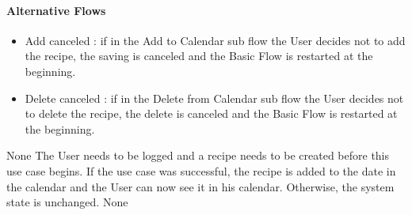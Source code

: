 {  \paragraph{Alternative Flows}
  \begin{itemize}
    \item Add canceled : if in the Add to Calendar sub flow the User decides not to add the recipe, the saving is canceled and the Basic Flow is restarted at the beginning.
    \item Delete canceled : if in the Delete from Calendar sub flow the User decides not to delete the recipe, the delete is canceled and the Basic Flow is restarted at the beginning.
  \end{itemize}
}
{None}
{The User needs to be logged and a recipe needs to be created before this use case begins.}
{If the use case was successful, the recipe is added to the date in the calendar and the User can now see it in his calendar. Otherwise, the system state is unchanged.}
{None}